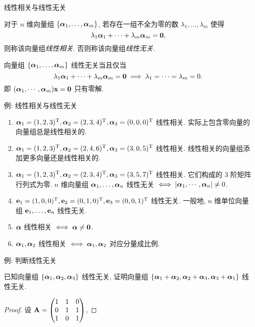 \begin{frame}{线性相关与线性无关}
	\onslide<+->
	\begin{definition}
		对于 $n$ 维向量组 $\{\bma_1,\dots,\bma_m\}$,
		若存在一组\alert{不全为零}的数 $\lambda_1,\dots,\lambda_m$ 使得
		\[\lambda_1\bma_1+\dots+\lambda_m\bma_m={\bf0},\]
		则称该向量组\emph{线性相关}.
		否则称该向量组\emph{线性无关}.
	\end{definition}
	\onslide<+->
	向量组 $\{\bma_1,\dots,\bma_m\}$ 线性无关当且仅当
	\[\lambda_1\bma_1+\dots+\lambda_m\bma_m={\bf0}\implies
	\lambda_1=\cdots=\lambda_m=0.\]
	\onslide<+->
	即 $(\bma_1,\cdots,\bma_m)\bfx={\bf0}$ 只有零解.
\end{frame}


\begin{frame}{例: 线性相关与线性无关}
	\onslide<+->
	\begin{example}
		\begin{enumerate}
			\item $\bma_1=(1,2,3)^\rmT,\bma_2=(2,3,4)^\rmT,\bma_3=(0,0,0)^\rmT$ 线性相关.
			实际上\alert{包含零向量的向量组总是线性相关的}.
			\item $\bma_1=(1,2,3)^\rmT,\bma_2=(2,4,6)^\rmT,\bma_3=(3,0,5)^\rmT$ 线性相关.
			\alert{线性相关的向量组添加更多向量还是线性相关的}.
			\item $\bma_1=(1,2,3)^\rmT,\bma_2=(2,3,4)^\rmT,\bma_3=(3,5,7)^\rmT$ 线性相关.
			它们构成的 $3$ 阶矩阵行列式为零.
			\alert{$n$ 维向量组 $\bma_1,\dots,\bma_n$ 线性无关 $\iff |\bma_1,\cdots,\bma_n|\neq 0$}.
			\item $\bfe_1=(1,0,0)^\rmT,\bfe_2=(0,1,0)^\rmT,\bfe_3=(0,0,1)^\rmT$ 线性无关.
			一般地, \alert{$n$ 维单位向量组 $\bfe_1,\dots,\bfe_n$ 线性无关}.
			\item $\bma$ 线性相关 $\iff \bma\neq{\bf0}$.
			\item $\bma_1,\bma_2$ 线性相关 $\iff \bma_1,\bma_2$ 对应分量成比例.
		\end{enumerate}
	\end{example}
\end{frame}


\begin{frame}{例: 判断线性无关}
	\onslide<+->
	\begin{example}
		已知向量组 $\{\bma_1,\bma_2,\bma_3\}$ 线性无关, 证明向量组 $\{\bma_1+\bma_2,\bma_2+\bma_3,\bma_3+\bma_1\}$ 线性无关.
	\end{example}
	\onslide<+->
	\begin{proof}
		设 $\bfA=\begin{pmatrix}
			1&1&0\\
			0&1&1\\
			1&0&1
		\end{pmatrix}$,
		\vspace{-\baselineskip}
	\end{proof}
\end{frame}


